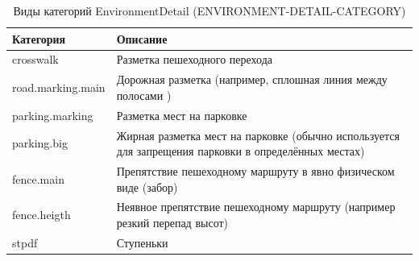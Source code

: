         \begin{center}
          \begin{xltabular}{\linewidth}{|l|X|}
            \caption{Виды категорий EnvironmentDetail (ENVIRONMENT-DETAIL-CATEGORY)}\\           \hline
            Категория         & Описание                                                                                             \\ \hline
            crosswalk         & Разметка пешеходного перехода                                                                        \\ \hline
            road.marking.main & Дорожная разметка (например, сплошная линия между полосами )                                          \\ \hline
            parking.marking   & Разметка мест на парковке                                                                            \\ \hline
            parking.big       & Жирная разметка мест на парковке (обычно используется для запрещения парковки в определённых местах) \\ \hline
            fence.main        & Препятствие пешеходному маршруту в явно физическом виде (забор)                                      \\ \hline
            fence.heigth      & Неявное препятствие пешеходному маршруту (например резкий перепад высот)                             \\ \hline
            stpdf             & Ступеньки                                                                                            \\ \hline
          \end{xltabular}
        \end{center}


